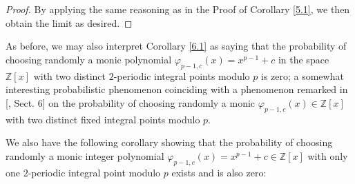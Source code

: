\documentclass{article}
\theoremstyle{plain}
\theoremstyle{definition}
\begin{document}
\begin{proof}
By applying the same reasoning as in the Proof of Corollary \ref{5.1}, we then obtain the limit as desired.
\end{proof} \noindent As before, we may also interpret Corollary \ref{6.1} as saying that the probability of choosing randomly a monic polynomial $\varphi_{p-1,c}(x) = x^{p-1}+c$ in the space $\mathbb{Z}[x]$ with two distinct $2$-periodic integral points modulo $p$ is zero; a somewhat interesting probabilistic phenomenon coinciding with a phenomenon remarked in [\cite{BK1}, Sect. 6] on the probability of choosing randomly a monic $\varphi_{p-1,c}(x)\in \mathbb{Z}[x]$ with two distinct fixed integral points modulo $p$.

We also have the following corollary showing that the probability of choosing randomly a monic integer polynomial $\varphi_{p-1,c}(x)=x^{p-1}+c \in \mathbb{Z}[x]$ with only one $2$-periodic integral point modulo $p$ exists and is also zero:
\end{document}
